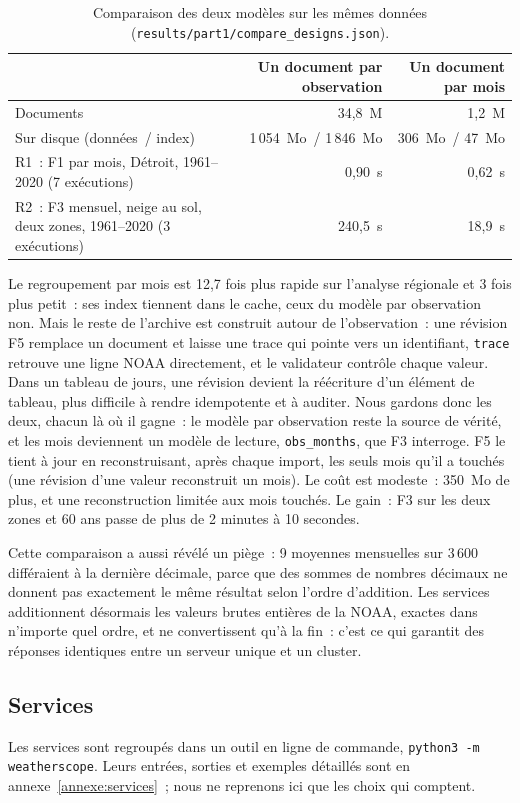 \begin{table}[h!]
  \centering
  \small
  \begin{tabular}{lrr}
    \hline
     & Un document par observation & Un document par mois \\
    \hline
    Documents & 34,8~M & 1,2~M \\
    Sur disque (données~/ index) & 1\,054~Mo~/ 1\,846~Mo & 306~Mo~/ 47~Mo \\
    R1~: F1 par mois, Détroit, 1961--2020 (7 exécutions) & 0,90~s & 0,62~s \\
    R2~: F3 mensuel, neige au sol, deux zones, 1961--2020 (3 exécutions) & 240,5~s & 18,9~s \\
    \hline
  \end{tabular}
  \caption{Comparaison des deux modèles sur les mêmes données (\texttt{results/part1/compare\_designs.json}).}
  \label{tab:conception}
\end{table}

Le regroupement par mois est 12,7 fois plus rapide sur l'analyse régionale et 3 fois plus petit~: ses index tiennent dans le cache, ceux du modèle par observation non. Mais le reste de l'archive est construit autour de l'observation~: une révision F5 remplace un document et laisse une trace qui pointe vers un identifiant, \texttt{trace} retrouve une ligne NOAA directement, et le validateur contrôle chaque valeur. Dans un tableau de jours, une révision devient la réécriture d'un élément de tableau, plus difficile à rendre idempotente et à auditer. Nous gardons donc les deux, chacun là où il gagne~: le modèle par observation reste la source de vérité, et les mois deviennent un modèle de lecture, \texttt{obs\_months}, que F3 interroge. F5 le tient à jour en reconstruisant, après chaque import, les seuls mois qu'il a touchés (une révision d'une valeur reconstruit un mois). Le coût est modeste~: 350~Mo de plus, et une reconstruction limitée aux mois touchés. Le gain~: F3 sur les deux zones et 60 ans passe de plus de 2 minutes à 10 secondes.

Cette comparaison a aussi révélé un piège~: 9 moyennes mensuelles sur 3\,600 différaient à la dernière décimale, parce que des sommes de nombres décimaux ne donnent pas exactement le même résultat selon l'ordre d'addition. Les services additionnent désormais les valeurs brutes entières de la NOAA, exactes dans n'importe quel ordre, et ne convertissent qu'à la fin~: c'est ce qui garantit des réponses identiques entre un serveur unique et un cluster.

\subsection{Services}
Les services sont regroupés dans un outil en ligne de commande, \texttt{python3 -m weatherscope}. Leurs entrées, sorties et exemples détaillés sont en annexe~\ref{annexe:services}~; nous ne reprenons ici que les choix qui comptent.

